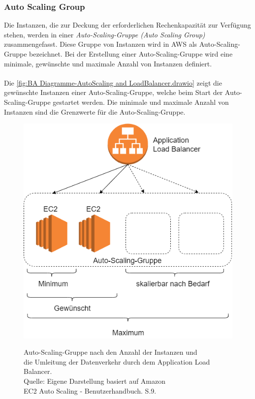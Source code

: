 \subsubsection*{Auto Scaling Group}
Die Instanzen, die zur Deckung der erforderlichen Rechenkapazität zur Verfügung stehen, werden in einer \textit{Auto-Scaling-Gruppe (Auto Scaling Group)} zusammengefasst. Diese Gruppe von Instanzen wird in AWS als Auto-Scaling-Gruppe bezeichnet. Bei der Erstellung einer Auto-Scaling-Gruppe wird eine minimale, gewünschte und maximale Anzahl von Instanzen definiert. 
\\\\
Die \autoref{fig:BA Diagramme-AutoScaling and LoadBalancer.drawio} zeigt die gewünschte Instanzen einer Auto-Scaling-Gruppe, welche beim Start der Auto-Scaling-Gruppe gestartet werden. Die minimale und maximale Anzahl von Instanzen sind die Grenzwerte für die Auto-Scaling-Gruppe.  
\begin{figure}[h]
  \centering
  \includegraphics[scale=0.5]{sources/BA Diagramme-AutoScaling and LoadBalancer.drawio}
  \caption[Auto-Scaling-Gruppe nach den Anzahl der Instanzen und Umleitung der Datenverkehr durch dem Application Load Balancer]{}
  \label{fig:BA Diagramme-AutoScaling and LoadBalancer.drawio} 
  Auto-Scaling-Gruppe nach den Anzahl der Instanzen und\\ die Umleitung der Datenverkehr durch dem Application Load Balancer.\\
  Quelle: Eigene Darstellung %
  basiert auf Amazon \\
  EC2 Auto Scaling - Benutzerhandbuch. S.9\cite{AMZ31}.
\end{figure}
\\\\
